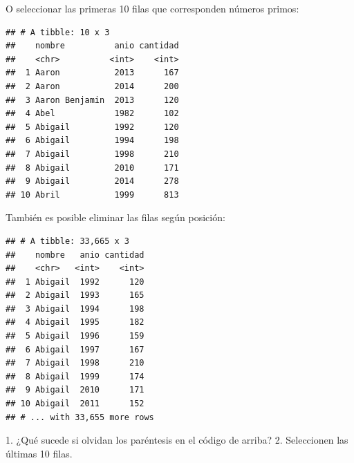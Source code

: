 \documentclass[]{book}
\newenvironment{Shaded}{\begin{snugshade}}{\end{snugshade}}
\newcommand{\CommentTok}[1]{\textcolor[rgb]{0.56,0.35,0.01}{\textit{#1}}}
\newcommand{\DecValTok}[1]{\textcolor[rgb]{0.00,0.00,0.81}{#1}}
\newcommand{\KeywordTok}[1]{\textcolor[rgb]{0.13,0.29,0.53}{\textbf{#1}}}
\newcommand{\NormalTok}[1]{#1}
\newcommand{\OperatorTok}[1]{\textcolor[rgb]{0.81,0.36,0.00}{\textbf{#1}}}
\newcommand{\StringTok}[1]{\textcolor[rgb]{0.31,0.60,0.02}{#1}}
\theoremstyle{definition}
\theoremstyle{definition}
\theoremstyle{definition}
\theoremstyle{remark}
\let\BeginKnitrBlock\begin \let\EndKnitrBlock\end
\begin{document}
O seleccionar las primeras 10 filas que corresponden números primos:

\begin{Shaded}
\end{Shaded}

\begin{verbatim}
## # A tibble: 10 x 3
##    nombre          anio cantidad
##    <chr>          <int>    <int>
##  1 Aaron           2013      167
##  2 Aaron           2014      200
##  3 Aaron Benjamin  2013      120
##  4 Abel            1982      102
##  5 Abigail         1992      120
##  6 Abigail         1994      198
##  7 Abigail         1998      210
##  8 Abigail         2010      171
##  9 Abigail         2014      278
## 10 Abril           1999      813
\end{verbatim}

También es posible eliminar las filas según posición:

\begin{Shaded}
\end{Shaded}

\begin{verbatim}
## # A tibble: 33,665 x 3
##    nombre   anio cantidad
##    <chr>   <int>    <int>
##  1 Abigail  1992      120
##  2 Abigail  1993      165
##  3 Abigail  1994      198
##  4 Abigail  1995      182
##  5 Abigail  1996      159
##  6 Abigail  1997      167
##  7 Abigail  1998      210
##  8 Abigail  1999      174
##  9 Abigail  2010      171
## 10 Abigail  2011      152
## # ... with 33,655 more rows
\end{verbatim}

\BeginKnitrBlock{exercise}
\protect\hypertarget{exr:ejercicio-9}{}{\label{exr:ejercicio-9} } 1. ¿Qué
sucede si olvidan los paréntesis en el código de arriba? 2. Seleccionen
las últimas 10 filas.
\EndKnitrBlock{exercise}
\end{document}
